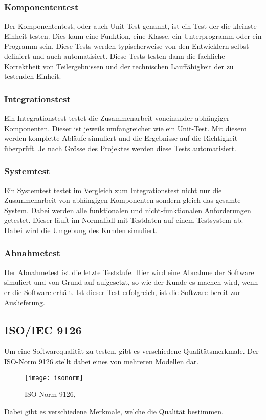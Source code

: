 \subsubsection{Komponententest}
Der Komponententest, oder auch Unit-Test genannt, ist ein Test der die kleinste Einheit testen. Dies kann eine Funktion, eine Klasse, ein Unterprogramm oder ein Programm sein. Diese Tests werden typischerweise von den Entwicklern selbst definiert und auch automatisiert. Diese Tests testen dann die fachliche Korrektheit von Teilergebnissen und der technischen Lauffähigkeit der zu testenden Einheit.
\subsubsection{Integrationstest}
Ein Integrationstest testet die Zusammenarbeit voneinander abhängiger Komponenten. Dieser ist jeweils umfangreicher wie ein Unit-Test. Mit diesem werden komplette Abläufe simuliert und die Ergebnisse auf die Richtigkeit überprüft. Je nach Grösse des Projektes werden diese Tests automatisiert.
\subsubsection{Systemtest}
Ein Systemtest testet im Vergleich zum Integrationstest nicht nur die Zusammenarbeit von abhängigen Komponenten sondern gleich das gesamte System. Dabei werden alle funktionalen und nicht-funktionalen Anforderungen getestet. Dieser läuft im Normalfall mit Testdaten auf einem Testsystem ab. Dabei wird die Umgebung des Kunden simuliert.
\subsubsection{Abnahmetest}
Der Abnahmetest ist die letzte Teststufe. Hier wird eine Abnahme der Software simuliert und von Grund auf aufgesetzt, so wie der Kunde es machen wird, wenn er die Software erhält. Ist dieser Test erfolgreich, ist die Software bereit zur Auslieferung.
\cite{wiki:Softwaretest}
\subsection{ISO/IEC 9126}
Um eine Softwarequalität zu testen, gibt es verschiedene Qualitätsmerkmale. Der ISO-Norm 9126 stellt dabei eines von mehreren Modellen dar.
\begin{figure}[H]
	\centering
	\texttt{[image: isonorm]}
	\caption{ISO-Norm 9126, \cite{wiki:ISOimage}}
\end{figure}
Dabei gibt es verschiedene Merkmale, welche die Qualität bestimmen.
